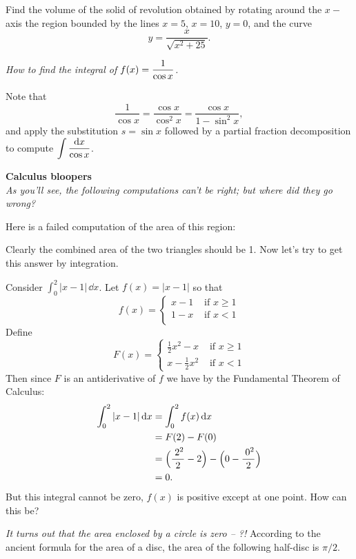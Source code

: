\begin{multicols}{2}
\problem %
Find the volume of the solid of revolution obtained by rotating around
the $x-$axis the
region bounded by the lines $x=5$, $x=10$, $y=0$, and the curve
\[
y=\frac{x}{\sqrt{x^2 +25}}.
\]

\problem \itshape How to find the integral of $\displaystyle f(x)=\frac1{\cos x}$.\upshape %

Note that
\[
\frac1{\cos x} = \frac{\cos x}{\cos^2 x} = \frac{\cos x}{1-\sin^2 x},
\]
and apply the substitution $s=\sin x$ followed by a partial fraction
decomposition to compute $\displaystyle\int\frac{\mathrm{d} x}{\cos x}$.


\bigskip

\begin{center}
  \textcolor{badgerred}{\bfseries Calculus bloopers}\\
  \textcolor{badgerred}{\itshape As you'll see, the following computations can't
    be right; but where did they go wrong?}
\end{center}

\problem Here is a failed computation of the area of this region: %


\noindent%
Clearly the combined area of the two triangles should be 1.  Now let's try
to get this answer by integration.

Consider $\int_0^2 |x-1|\,\dd x$.  Let $f(x)=|x-1|$ so that
\[
f(x)=
\begin{cases}
  x-1 & \text{ if } x\geq 1\\
  1-x & \text{ if } x < 1\\
\end{cases}
\]
Define
\[
F(x)=
\begin{cases}
  \frac{1}{2}x^2-x & \text{ if } x\geq 1\\
  x-\frac{1}{2}x^2 & \text{ if } x < 1
\end{cases}
\]
Then since $F$ is an antiderivative of $f$ we have by the
Fundamental Theorem of Calculus:
\begin{align*}
  \int_0^2 |x-1|\,\mathrm{d} x
  &=\int_0^2 f(x)\,\mathrm{d} x\\
  &= F(2)-F(0)\\
  &=\Bigl(\frac{\;2^2}{2}-2\Bigr) - \Bigl(0-\frac{\;0^2}{2}\Bigr)\\
  &=0.
\end{align*}
But this integral cannot be zero, $f(x)$ is positive
except at one point.   How can this be?

\problem \textcolor{badgerred}{\itshape It turns out that the area enclosed by a %
circle is zero -- ?!}
According to the ancient formula for the area of a disc,  the
area of the following half-disc is $\pi/2$.


\end{multicols}
